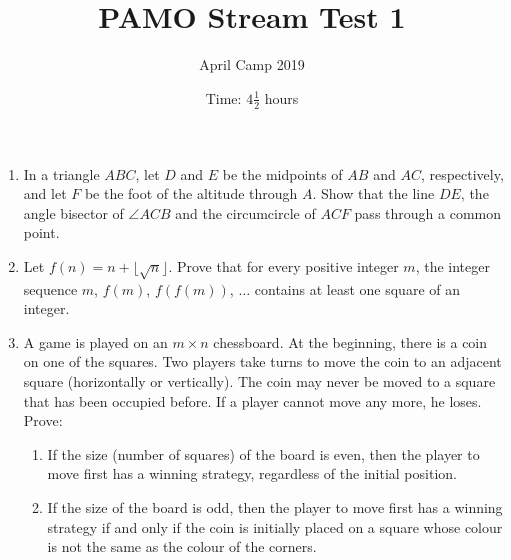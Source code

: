 \documentclass[a4paper, 12pt]{article}
\title{PAMO Stream Test 1}
\author{April Camp 2019}
\date{Time: $4 \frac{1}{2}$ hours}
\begin{document}
 \maketitle

\begin{enumerate}

\item\label{problem:geometry_common_point} %
In a triangle $ABC$, let $D$ and $E$ be the midpoints of $AB$ and $AC$, respectively, and let $F$ be the foot of the altitude through $A$. Show that the line $DE$, the angle bisector of $\angle ACB$ and the circumcircle of $ACF$ pass through a common point.


\item Let $f(n) = n + \lfloor \sqrt{n} \rfloor$. Prove that for every positive integer $m$, the integer sequence $m$, $f(m)$, $f(f(m))$, $\dots$ contains at least one square of an integer.


\item A game is played on an $m \times n$ chessboard. At the beginning, there is a coin on one of the squares. Two players take turns to move the coin to an adjacent square (horizontally or vertically). The coin may never be moved to a square that has been occupied before. If a player cannot move any more, he loses. Prove:
\begin{enumerate}

\item If the size (number of squares) of the board is even, then the player to move first has a winning strategy, regardless of the initial position.

\item If the size of the board is odd, then the player to move first has a winning strategy if and only if the coin is initially placed on a square whose colour is not the same as the colour of the corners.

\end{enumerate}


\end{enumerate}

\vfill

\centering

\vspace{12mm}
\end{document}
